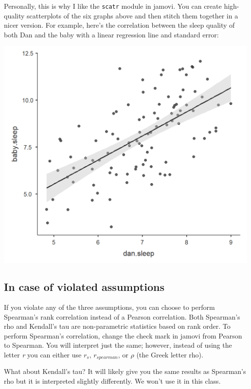 \documentclass[
]{book}
\begin{document}
Personally, this is why I like the \texttt{scatr} module in jamovi. You can create high-quality scatterplots of the six graphs above and then stitch them together in a nicer version. For example, here's the correlation between the sleep quality of both Dan and the baby with a linear regression line and standard error:

\includegraphics[width=5.20833in,height=\textheight]{images/08-correlation/correlation-plot1.png}

\hypertarget{in-case-of-violated-assumptions-7}{%
\subsection{In case of violated assumptions}\label{in-case-of-violated-assumptions-7}}

If you violate any of the three assumptions, you can choose to perform Spearman's rank correlation instead of a Pearson correlation. Both Spearman's rho and Kendall's tau are non-parametric statistics based on rank order. To perform Spearman's correlation, change the check mark in jamovi from Pearson to Spearman. You will interpret just the same; however, instead of using the letter \emph{r} you can either use \(r_s\), \(r_{spearman}\), or \(\rho\) (the Greek letter rho).

What about Kendall's tau? It will likely give you the same results as Spearman's rho but it is interpreted slightly differently. We won't use it in this class.
\end{document}
